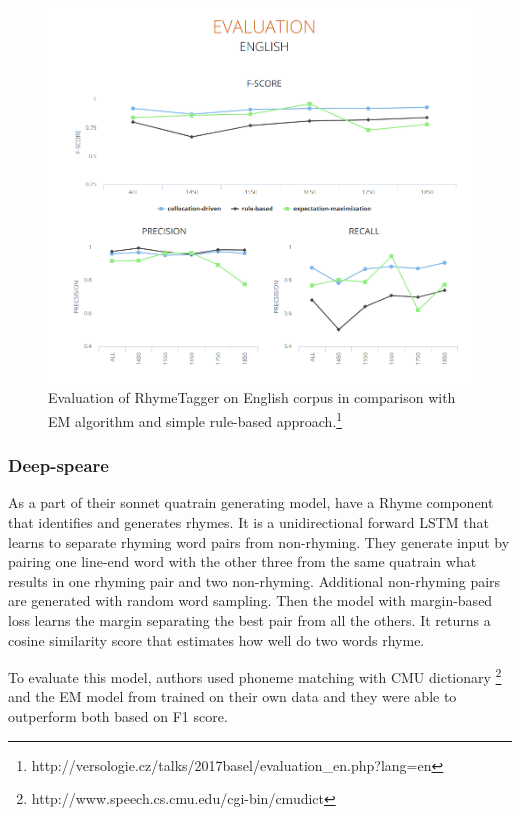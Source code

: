 \begin{figure}[h]\centering
	\includegraphics[scale=0.4]{../img/plechac_eval.png}
	\caption{Evaluation of RhymeTagger on English corpus in comparison with EM algorithm and simple rule-based approach.\protect\footnote{http://versologie.cz/talks/2017basel/evaluation\_en.php?lang=en}}\label{screenshotRT}
\end{figure}

\subsubsection*{Deep-speare}
As a part of their sonnet quatrain generating model, \cite{lau2018deep} have a Rhyme component that identifies and generates rhymes. It is a unidirectional forward LSTM that learns to separate rhyming word pairs from non-rhyming. They generate input by pairing one line-end word with the other three from the same quatrain what results in one rhyming pair and two non-rhyming. Additional non-rhyming pairs are generated with random word sampling. Then the model with margin-based loss learns the margin separating the best pair from all the others. It returns a cosine similarity score that estimates how well do two words rhyme.

To evaluate this model, authors used phoneme matching with CMU dictionary \footnote{http://www.speech.cs.cmu.edu/cgi-bin/cmudict} and the EM model from \cite{reddy2011unsupervised} trained on their own data and they were able to outperform both based on F1 score.



